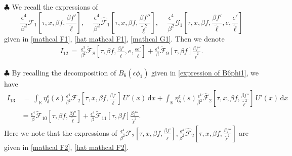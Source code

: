 \documentclass[10pt, reqno]{amsart}
\numberwithin{equation}{section}
\theoremstyle{definition}
\begin{document}
{\smallskip
\noindent $\clubsuit$
We recall the expressions of
$$
\frac{\epsilon^4}{\beta^2} \mathcal F_1\left[\tau, x, \beta f, \frac{\beta f'}{\tilde\ell} \right],
\quad\,\frac{\epsilon^4}{\beta^2} \hat{\mathcal F}_1\left[\tau, x, \beta f, \frac{\beta f''}{\tilde\ell^2} \right],
\quad\,\frac{\epsilon^4} {\beta^2} \mathcal G_1\left[\tau, x, \beta f, \frac{\beta f'}{\tilde\ell}, e, \frac{e'}{\tilde\ell}\right]
$$
given in \eqref{mathcal F1}, \eqref{hat mathcal F1}, \eqref{mathcal G1}.
 Then we denote
\begin{align} \label{intergral Ux higher order}
I_{12}\,=\,
 \frac{\epsilon^3}{\beta^2}\tilde{\mathcal F}_{8}\left[\tau, \beta f, \frac{\beta {f}'}{\tilde\ell}, e, \frac{\epsilon e'}{\tilde\ell}\right]
 + \frac{\epsilon^4}{\beta}\tilde{\mathcal F}_{9}\left[\tau, \beta f \right] \frac{\beta f''} {\tilde\ell^2}.
\end{align}



 \smallskip\noindent $\clubsuit$
By recalling the decomposition of $B_6 (\epsilon \phi_1)$ given in \eqref{expression of B6phi1}, we have
\begin{align}\label{B6phi1 intergral Ux}
I_{13}
 &\,=\,
 \int_{{\mathbb R}} \eta_\delta^\epsilon(s) \frac{\epsilon^4}{\beta^2} \mathcal F_2\left[\tau, x, \beta f, \frac{\beta f'}{\tilde\ell}\right] \, U'(x) \,{\mathrm d}x
 + \int_{{\mathbb R}} \eta_\delta^\epsilon(s) \frac{\epsilon^4}{\beta^2} \hat{\mathcal F}_2\left[\tau, x, \beta f, \frac{\beta f''}{\tilde\ell^2} \right] \, U'(x) \,{\mathrm d}x
\nonumber\\[2mm]
 &=
 \frac{\epsilon^4}{\beta}\tilde{\mathcal F}_{10}\left[\tau, \beta f, \frac{\beta {f}'}{\tilde\ell}\right]
 + \frac{\epsilon^4}{\beta}\tilde{\mathcal F}_{11}\left[\tau, \beta f \right] \frac{\beta f''} {\tilde\ell^2}.
\end{align}
Here we note that the expressions of
$\frac{\epsilon^4}{\beta^2} \mathcal F_2\left[\tau, x, \beta f, \frac{\beta f'}{\tilde\ell}\right], \frac{\epsilon^4}{\beta^2} \hat{\mathcal F}_2\left[\tau, x, \beta f, \frac{\beta f''}{\tilde\ell^2} \right] $ are given in \eqref{mathcal F2}, \eqref{hat mathcal F2}.






}
\end{document}
